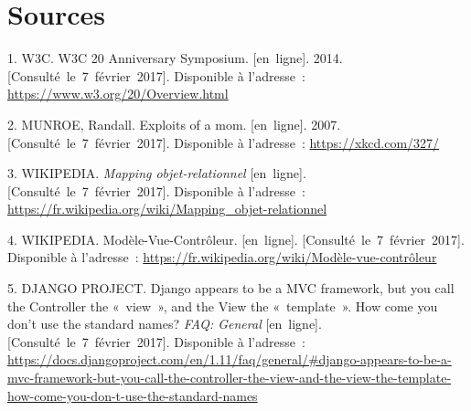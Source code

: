 \begin{otherlanguage}{english}

\end{otherlanguage}

\begin{otherlanguage}{english}

\end{otherlanguage}

\hypertarget{sources}{%
\section*{Sources}\label{sources}}

\hypertarget{refs}{}
\leavevmode\hypertarget{ref-w3c:20}{}%
1. W3C. W3C 20 Anniversary Symposium. {[}en~ligne{]}. 2014.
{[}Consulté~le~7~février~2017{]}. Disponible à l'adresse~:
\url{https://www.w3.org/20/Overview.html}

\leavevmode\hypertarget{ref-xkcd:327}{}%
2. MUNROE, Randall. Exploits of a mom. {[}en~ligne{]}. 2007.
{[}Consulté~le~7~février~2017{]}. Disponible à l'adresse~:
\url{https://xkcd.com/327/}

\leavevmode\hypertarget{ref-wiki:orm}{}%
3. WIKIPEDIA. \emph{Mapping objet-relationnel} {[}en~ligne{]}.
{[}Consulté~le~7~février~2017{]}. Disponible à l'adresse~:
\url{https://fr.wikipedia.org/wiki/Mapping_objet-relationnel}

\leavevmode\hypertarget{ref-wiki:mvc}{}%
4. WIKIPEDIA. Modèle-Vue-Contrôleur. {[}en~ligne{]}.
{[}Consulté~le~7~février~2017{]}. Disponible à l'adresse~:
\url{https://fr.wikipedia.org/wiki/Modèle-vue-contrôleur}

\leavevmode\hypertarget{ref-django:mtv}{}%
5. DJANGO PROJECT. Django appears to be a MVC framework, but you call
the Controller the «~view~», and the View the «~template~». How come you
don't use the standard names? \emph{FAQ: General} {[}en~ligne{]}.
{[}Consulté~le~7~février~2017{]}. Disponible à l'adresse~:
\url{https://docs.djangoproject.com/en/1.11/faq/general/\#django-appears-to-be-a-mvc-framework-but-you-call-the-controller-the-view-and-the-view-the-template-how-come-you-don-t-use-the-standard-names}
